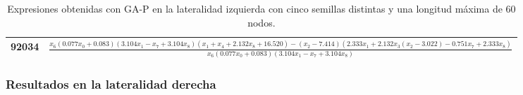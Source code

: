 \begin{table}[H]
{\begin{tabular}{|c|c|}
92034            & $\frac{x_{6} \left(0.077 x_{0} + 0.083\right) \left(3.104 x_{1} - x_{7} + 3.104 x_{8}\right) \left(x_{1} + x_{4} + 2.132 x_{8} + 16.520\right) - \left(x_{2} - 7.414\right) \left(2.333 x_{1} + 2.132 x_{3} \left(x_{2} - 3.022\right) - 0.751 x_{7} + 2.333 x_{8}\right)}{x_{6} \left(0.077 x_{0} + 0.083\right) \left(3.104 x_{1} - x_{7} + 3.104 x_{8}\right)}$               \\ \hline
\end{tabular}%
}
\caption{Expresiones obtenidas con GA-P en la lateralidad izquierda con cinco semillas distintas y una longitud máxima de 60 nodos.}\label{table:exp_GAP_l0_60}
\end{table}


\subsubsection{Resultados en la lateralidad derecha}




\begin{table}[H]
\centering
{}
\caption{Resultados de GA-P en la lateralidad derecha con cinco semillas distintas y una longitud máxima de 20 nodos.}\label{table:resultados_GAP_l1_20}

\end{table}




